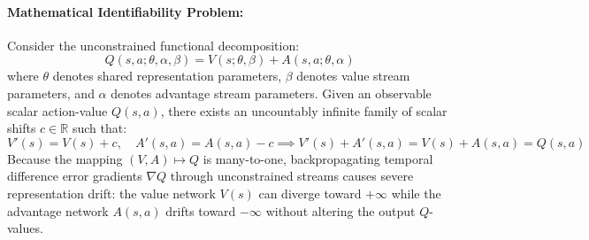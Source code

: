 \documentclass[12pt,a4paper,oneside]{report}
\begin{document}
\paragraph{Mathematical Identifiability Problem:}
Consider the unconstrained functional decomposition:
\begin{equation}
Q(s, a; \theta, \alpha, \beta) = V(s; \theta, \beta) + A(s, a; \theta, \alpha)
\end{equation}
where $\theta$ denotes shared representation parameters, $\beta$ denotes value stream parameters, and $\alpha$ denotes advantage stream parameters. 
Given an observable scalar action-value $Q(s, a)$, there exists an uncountably infinite family of scalar shifts $c \in \mathbb{R}$ such that:
\begin{equation}
V'(s) = V(s) + c, \quad A'(s, a) = A(s, a) - c \implies V'(s) + A'(s, a) = V(s) + A(s, a) = Q(s, a)
\end{equation}
Because the mapping $(V, A) \mapsto Q$ is many-to-one, backpropagating temporal difference error gradients $\nabla Q$ through unconstrained streams causes severe representation drift: the value network $V(s)$ can diverge toward $+\infty$ while the advantage network $A(s, a)$ drifts toward $-\infty$ without altering the output $Q$-values.
\end{document}
